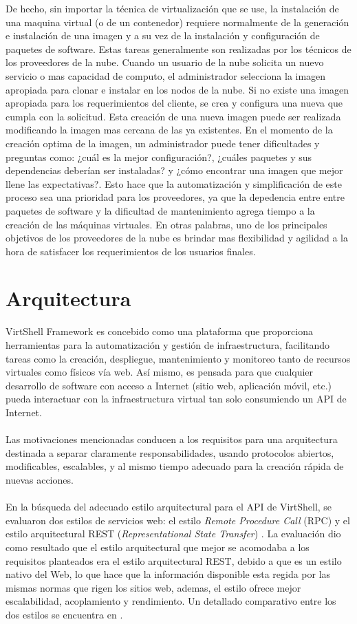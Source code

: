 \documentclass[conference, spanish]{IEEEtran}
\begin{document}
De hecho, sin importar la técnica de virtualización que se use, la instalación de una maquina virtual (o de un contenedor) requiere normalmente de la generación e instalación de una imagen y a su vez de la instalación y configuración de paquetes de software. Estas tareas generalmente son realizadas por los técnicos de los proveedores de la nube. Cuando un usuario de la nube solicita un nuevo servicio o mas capacidad de computo, el administrador selecciona la imagen apropiada para clonar e instalar en los nodos de la nube. Si no existe una imagen apropiada para los requerimientos del cliente, se crea y configura una nueva que cumpla con la solicitud. Esta creación de una nueva imagen puede ser realizada modificando la imagen mas cercana de las ya existentes. En el momento de la creación optima de la imagen, un administrador puede tener dificultades y preguntas como: ¿cuál es la mejor configuración?, ¿cuáles paquetes y sus dependencias deberían ser instaladas? y ¿cómo encontrar una imagen que mejor llene las expectativas?. Esto hace que la automatización y simplificación de este proceso sea una prioridad para los proveedores, ya que la depedencia entre entre paquetes de software y la dificultad de mantenimiento agrega tiempo a la creación de las máquinas virtuales. En otras palabras, uno de los principales objetivos de los proveedores de la nube es brindar mas flexibilidad y agilidad a la hora de satisfacer los requerimientos de los usuarios finales.

\section{Arquitectura}
VirtShell Framework es concebido como una plataforma que proporciona herramientas para la automatización y gestión de infraestructura, facilitando tareas como la creación, despliegue, mantenimiento y monitoreo tanto de recursos virtuales como físicos vía web. Así mismo, es pensada para que cualquier desarrollo de software con acceso a Internet (sitio web, aplicación móvil, etc.) pueda interactuar con la infraestructura virtual tan solo consumiendo un API de Internet.\\
\\
Las motivaciones mencionadas conducen a los requisitos para una arquitectura destinada a separar claramente responsabilidades, usando protocolos abiertos, modificables, escalables, y al mismo tiempo adecuado para la creación rápida de nuevas acciones. \\
\\
En la búsqueda del adecuado estilo arquitectural para el API de VirtShell, se evaluaron dos estilos de servicios web: el estilo \emph{Remote Procedure Call} (RPC) y el estilo arquitectural REST (\emph{Representational State Transfer}) \cite{fielding00}. La evaluación dio como resultado que el estilo arquitectural que mejor se acomodaba a los requisitos planteados era el estilo arquitectural REST, debido a que es un estilo nativo del Web, lo que hace que la información disponible esta regida por las mismas normas que rigen los sitios web, ademas, el estilo ofrece mejor escalabilidad, acoplamiento y rendimiento. Un detallado comparativo entre los dos estilos se encuentra en \cite{Xinyang09}. 
\end{document}
